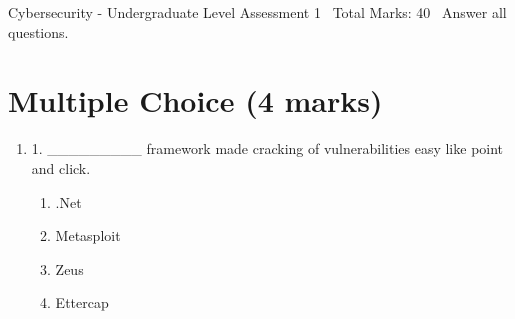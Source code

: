 \documentclass[12pt]{article}
\begin{document}
\begin{center}
Cybersecurity - Undergraduate Level Assessment 1 \
Total Marks: 40 \
Answer all questions.
\end{center}

\section*{Multiple Choice (4 marks)}
\begin{enumerate}[label=\arabic*.]
\item 1. \_\_\_\_\_\_\_\_\_ framework made cracking of vulnerabilities easy like point and click.
\begin{enumerate}[label=(\alph*)]
    \item .Net
    \item Metasploit
    \item Zeus
    \item Ettercap
\end{enumerate}

\end{enumerate}
\end{document}
